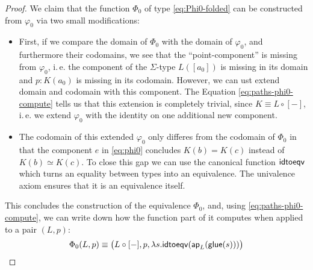 \begin{proof}
We claim that the function $\Phi_0$ of type \eqref{eq:Phi0-folded} can be
constructed from $\varphi_0$ via two small modifications:
\begin{itemize}
\item First, if we compare the domain of $\Phi_0$ with the domain of $\varphi_0$,
and furthermore their codomains,
we see that the ``point-component'' is missing from $\varphi_0$, i.\,e.
the component of the $\Sigma$-type $L([a_0])$ is missing in its
domain and $p : K(a_0)$ is missing in its codomain.
However, we can ust extend domain and codomain with this component.
The Equation \eqref{eq:paths-phi0-compute} tells us that this extension
is completely trivial, since $K \equiv L \circ [-]$, i.\,e. we extend
$\varphi_0$ with the identity on one additional new component.
\item The codomain of this extended $\varphi_0$ only differes from the codomain
of $\Phi_0$ in that the component $e$ in \eqref{eq:phi0}
concludes $K(b) = K(c)$ instead of $K(b) \simeq K(c)$.
To close this gap we can use the canonical function $\mathsf{idtoeqv}$ which
turns an equality between types into an equivalence.
The univalence axiom ensures that it is an equivalence itself.
\end{itemize}
This concludes the construction of the equivalence $\Phi_0$, and,
using \eqref{eq:paths-phi0-compute}, we can
write down how the function part of it computes when applied to
a pair $(L, p)$:
 \begin{equation} \label{eq:paths-Phi0-compute}
  \Phi_0(L,p) \equiv \big(L \circ [-], p, \lambda s. \mathsf{idtoeqv}(\mathsf{ap}_L(\mathsf{glue}(s)))\big)
 \end{equation}


\end{proof}
